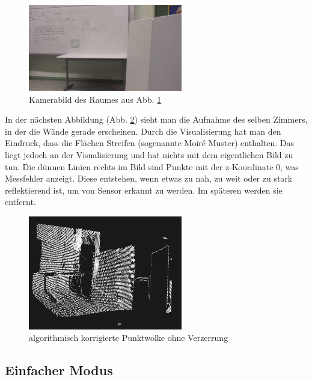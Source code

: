 \documentclass[a4paper,12pt,ngerman]{scrartcl}
\begin{document}
\begin{figure}[H]
	\centering
	\includegraphics[angle=180,width=0.6\textwidth]{20180125_171703}
	\caption{Kamerabild des Raumes aus Abb. \ref{room_at_school}}
	\label{room_at_school}
\end{figure} \par
In der nächsten Abbildung (Abb. \ref{before_filtering}) sieht
man die Aufnahme des selben Zimmers, in der die Wände gerade erscheinen. Durch die Visualisierung hat man
den Eindruck, dass die Flächen Streifen (sogenannte Moir\'{e} Muster) enthalten. Das liegt jedoch an der
Visualisierung und hat nichts mit dem eigentlichen Bild zu tun. Die dünnen Linien rechts im Bild sind Punkte
mit der z-Koordinate 0, was Messfehler anzeigt. Diese entstehen, wenn etwas zu nah, zu weit oder zu stark
reflektierend ist, um von Sensor erkannt zu werden. Im späteren werden sie entfernt.
\begin{figure}[H]
	\centering
	\includegraphics[width=0.6\textwidth]{before_filtering}
	\caption{algorithmisch korrigierte Punktwolke ohne Verzerrung}
	\label{before_filtering}
\end{figure} 

\subsection{Einfacher Modus}
\end{document}
